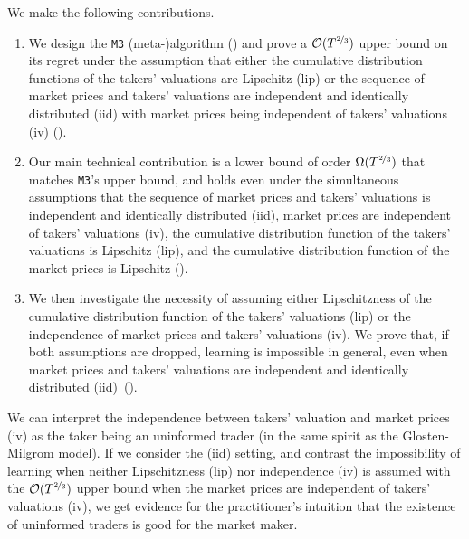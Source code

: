 \documentclass[final,12pt]{colt2025}
\newcommand{\cO}{\mathcal{O}}
\newcommand{\vin}{\texttt{M3}}
\begin{document}
We make the following contributions.
\begin{enumerate}[noitemsep]
    \item We design the \vin{} (meta-)algorithm () and prove a $\cO(T^{\nicefrac{2}{3}})$ upper bound on its regret under the assumption that either the cumulative distribution functions of the takers' valuations are Lipschitz (lip) or the sequence of market prices and takers' valuations are independent and identically distributed (iid) with market prices being independent of takers' valuations (iv) ().
    \item Our main technical contribution is a lower bound of order $\Omega(T^{\nicefrac{2}{3}})$ that matches \vin{}'s upper bound, and holds even under the simultaneous assumptions that the sequence of market prices and takers' valuations is independent and identically distributed (iid), market prices are independent of takers' valuations (iv), the cumulative distribution function of the takers' valuations is Lipschitz (lip), and the cumulative distribution function of the market prices is Lipschitz ().
    \item We then investigate the necessity of assuming either Lipschitzness of the cumulative distribution function of the takers' valuations (lip) or the independence of market prices and takers' valuations (iv). We prove that, if both assumptions are dropped, learning is impossible in general, even when market prices and takers' valuations are independent and identically distributed (iid)\ ().
\end{enumerate}

We can interpret the independence between takers' valuation and market prices (iv) as the taker being an uninformed trader (in the same spirit as the Glosten-Milgrom model). If we consider the (iid) setting, and contrast the impossibility of learning when neither Lipschitzness (lip) nor independence (iv) is assumed with the $\cO(T^{\nicefrac{2}{3}})$ upper bound when the market prices are independent of takers' valuations (iv), we get evidence for the practitioner's intuition that the existence of uninformed traders is good for the market maker.

\end{document}
